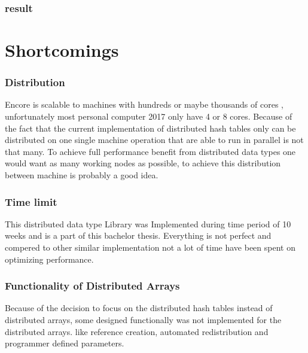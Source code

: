 \subsubsection{result}

\section{Shortcomings}
\subsubsection{Distribution}
Encore is scalable to machines with hundreds or maybe thousands of cores \cite{encore}, unfortunately most personal computer 2017 only have 4 or 8 cores. Because of the fact that the current implementation of distributed hash tables only can be distributed on one single machine operation that are able to run in parallel is not that many. To achieve full performance benefit from distributed data types one would want as many working nodes as possible, to achieve this distribution between machine is probably a good idea. 

\subsubsection{Time limit}
This distributed data type Library was Implemented during time period of 10 weeks and is a part of this bachelor thesis. Everything is not perfect and compered to other similar implementation not a lot of time have been spent on optimizing performance.

\subsubsection{Functionality of Distributed Arrays}
Because of the decision to focus on the distributed hash tables instead of distributed arrays, some designed functionally was not implemented for the distributed arrays. like reference creation, automated redistribution and programmer defined parameters.
\pagebreak
